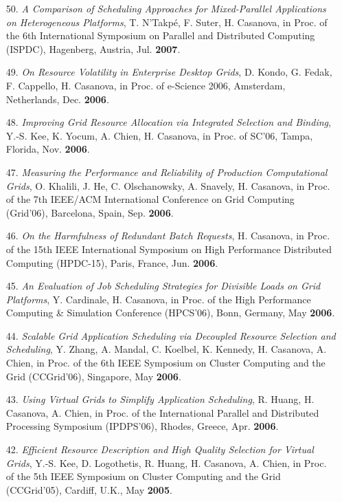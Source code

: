 \begin{enumerate}
\item[50.] {\it A Comparison of Scheduling Approaches for Mixed-Parallel Applications on Heterogeneous Platforms},  T. N'Takp\'e, F. Suter, H. Casanova, in Proc. of the 6th International Symposium on Parallel and Distributed Computing (ISPDC), Hagenberg, Austria, 
Jul. {\bf 2007}.

\item[49.] {\it On Resource Volatility in Enterprise Desktop Grids}, D. Kondo, G. Fedak, F. Cappello, H. Casanova, in Proc. of e-Science 2006, Amsterdam,
Netherlands, Dec. {\bf 2006}.

\item[48.] {\it Improving Grid Resource Allocation via Integrated Selection and
Binding}, Y.-S. Kee, K. Yocum, A. Chien, H. Casanova, in Proc. of SC'06,
Tampa, Florida, Nov. {\bf 2006}.

\item[47.] {\it Measuring the Performance and Reliability of Production
Computational Grids}, O. Khalili, J. He, C. Olschanowsky, A. Snavely, H.
Casanova, in Proc. of the 7th IEEE/ACM International Conference on Grid
Computing (Grid'06), Barcelona, Spain, Sep. {\bf 2006}.

\item[46.] {\it On the Harmfulness of Redundant Batch Requests}, H.
Casanova, in Proc. of the 15th IEEE International Symposium on High
Performance Distributed Computing (HPDC-15), Paris, France, Jun. {\bf
2006}.

\item[45.] {\it An Evaluation of Job Scheduling Strategies for Divisible
Loads on Grid Platforms}, Y. Cardinale, H. Casanova, in Proc. of the
High Performance Computing \& Simulation Conference (HPCS'06), Bonn,
Germany, May {\bf 2006}.

\item[44.] {\it Scalable Grid Application Scheduling via Decoupled Resource
Selection and Scheduling}, Y. Zhang, A. Mandal, C. Koelbel, K. Kennedy, H.
Casanova, A.  Chien, in Proc. of the 6th IEEE Symposium on Cluster
Computing and the Grid (CCGrid'06), Singapore, May {\bf 2006}.

\item[43.] {\it Using Virtual Grids to Simplify Application Scheduling},
R. Huang, H. Casanova, A. Chien, in Proc. of the
International Parallel and Distributed Processing Symposium (IPDPS'06),
Rhodes, Greece, Apr. {\bf 2006}.

\item[42.] {\it Efficient Resource Description and High Quality Selection
for Virtual Grids}, Y.-S. Kee, D. Logothetis, R. Huang, H. Casanova, A.
Chien, in Proc. of the 5th IEEE Symposium on Cluster
Computing and the Grid (CCGrid'05), Cardiff, U.K., May {\bf 2005}.


\end{enumerate}
